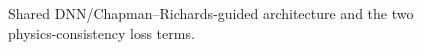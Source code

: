 \begin{figure}[!htbp]
\centering
{}
\caption{Shared DNN/Chapman--Richards-guided architecture and the two physics-consistency loss
terms.}
\label{fig:model-architecture}
\end{figure}

